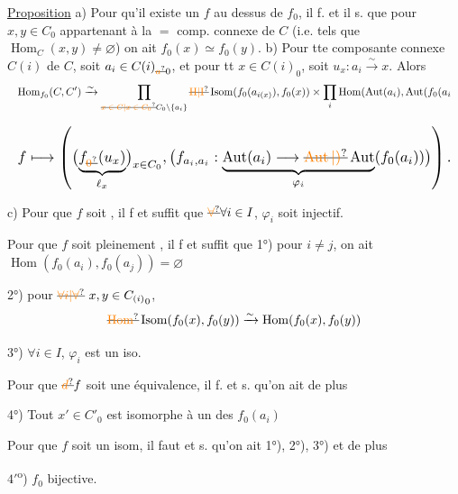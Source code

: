 \uline{Proposition} a) Pour qu'il existe un $f$ au dessus de $f_0$, il f. et il s. que pour $x,y\in C_0$ appartenant à la $=$ comp. connexe de $C$ (i.e. tels que $\operatorname{Hom}_C(x,y)\ne\varnothing$) on ait $f_0(x)\simeq f_0(y)$.  b) Pour tte composante connexe $C(i)$ de $C$, soit $a_i\in C(i)_{\deleted{\unsure{a}}0}$, et pour tt $x\in C(i)_0$, soit $u_x:a_i\xrightarrow{\sim}x$. Alors
\[
\resizebox{\linewidth}{!}{$\displaystyle\operatorname{Hom}_{f_0}(C,C')\xrightarrow{\sim}
\prod_{\deleted{\unsure{x\in C|x\in C_0}}C_0\setminus\{a_i\}}
\deleted{\unsure{\mathrm H|\mathrm I}}\operatorname{Isom}(f_0(a_{i(x)}),f_0(x))
\mathbin{\times}\prod_i\operatorname{Hom}(\operatorname{Aut}(a_i),\operatorname{Aut}(f_0(a_i$}
\]

\[
\resizebox{\linewidth}{!}{$\displaystyle f\longmapsto\left(\bigl(\underbrace{f_{\deleted{\unsure{0}}}(u_x)}_{\ell_x}\bigr)_{x\in C_0},
\bigl(f_{a_i,a_i}:\underbrace{\operatorname{Aut}(a_i)\longrightarrow\deleted{\unsure{\operatorname{Aut}|)}}\operatorname{Aut}}_{\varphi_i}(f_0(a_i))\bigr)\right).$}
\]

c) Pour que $f$ soit , il f et suffit que $\deleted{\unsure{\forall}}\forall i\in I$, $\varphi_i$ soit injectif.

Pour que $f$ soit pleinement , il f et suffit que \deleted{\unsure{;}} 1°) pour $i\ne j$, on ait $\operatorname{Hom}(f_0(a_i),f_0(a_j))=\varnothing$

2°) pour $\deleted{\unsure{\forall i|\forall}}\ x,y\in {C_{(i)}}_0$,
\[
\deleted{\unsure{\operatorname{Hom}}}\operatorname{Isom}(f_0(x),f_0(y))\xrightarrow{\sim}\operatorname{Hom}(f_0(x),f_0(y))
\]

3°) $\forall i\in I$, $\varphi_i$ est un iso.


Pour que $\deleted{\unsure{d}}f$ soit une équivalence, il f. et s. qu'on ait de plus

4°) Tout $x'\in C'_0$ est isomorphe à un des $f_0(a_i)$

Pour que $f$ soit un isom, il faut et s. qu'on ait 1°), 2°), 3°) et de plus

$4'$\textsuperscript{o}) $f_0$ bijective.

